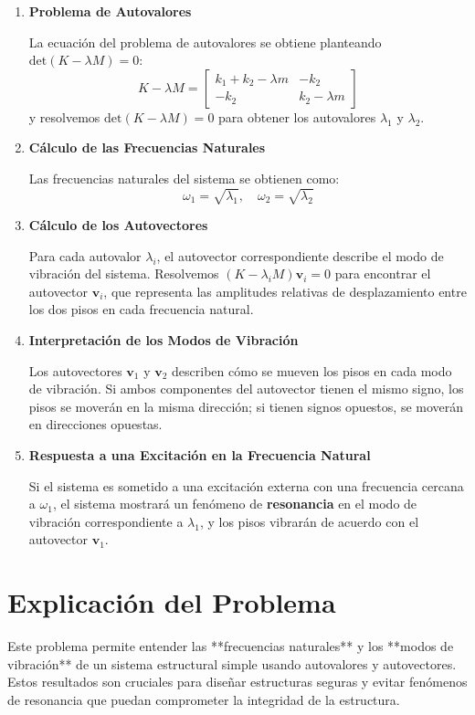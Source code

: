 \documentclass{article}
\begin{document}
\begin{enumerate}
    \item \textbf{Problema de Autovalores}

    La ecuación del problema de autovalores se obtiene planteando \(\text{det}(K - \lambda M) = 0\):
    \[
    K - \lambda M = \begin{bmatrix} k_1 + k_2 - \lambda m & -k_2 \\ -k_2 & k_2 - \lambda m \end{bmatrix}
    \]
    y resolvemos \(\text{det}(K - \lambda M) = 0\) para obtener los autovalores \(\lambda_1\) y \(\lambda_2\).

    \item \textbf{Cálculo de las Frecuencias Naturales}

    Las frecuencias naturales del sistema se obtienen como:
    \[
    \omega_1 = \sqrt{\lambda_1}, \quad \omega_2 = \sqrt{\lambda_2}
    \]

    \item \textbf{Cálculo de los Autovectores}

    Para cada autovalor \(\lambda_i\), el autovector correspondiente describe el modo de vibración del sistema. Resolvemos \((K - \lambda_i M) \mathbf{v}_i = 0\) para encontrar el autovector \(\mathbf{v}_i\), que representa las amplitudes relativas de desplazamiento entre los dos pisos en cada frecuencia natural.

    \item \textbf{Interpretación de los Modos de Vibración}

    Los autovectores \(\mathbf{v}_1\) y \(\mathbf{v}_2\) describen cómo se mueven los pisos en cada modo de vibración. Si ambos componentes del autovector tienen el mismo signo, los pisos se moverán en la misma dirección; si tienen signos opuestos, se moverán en direcciones opuestas.

    \item \textbf{Respuesta a una Excitación en la Frecuencia Natural}

    Si el sistema es sometido a una excitación externa con una frecuencia cercana a \(\omega_1\), el sistema mostrará un fenómeno de \textbf{resonancia} en el modo de vibración correspondiente a \(\lambda_1\), y los pisos vibrarán de acuerdo con el autovector \(\mathbf{v}_1\).
\end{enumerate}

\section*{Explicación del Problema}

Este problema permite entender las **frecuencias naturales** y los **modos de vibración** de un sistema estructural simple usando autovalores y autovectores. Estos resultados son cruciales para diseñar estructuras seguras y evitar fenómenos de resonancia que puedan comprometer la integridad de la estructura.
\end{document}
